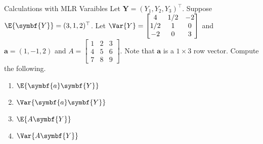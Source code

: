 \begin{Example}{Calculations with MLR Varaibles}{}
    Let $ \symbf{Y}=(Y_1,Y_2,Y_3)^\top $. Suppose
    $ \E{\symbf{Y}}= (3,1,2)^\top $. Let
    $ \Var{Y}=\begin{bmatrix}
            4   & 1/2 & -2 \\
            1/2 & 1   & 0  \\
            -2  & 0   & 3
        \end{bmatrix} $
    and
    $ \symbf{a}=(1,-1,2) $
    and
    $ A=\begin{bmatrix}
            1 & 2 & 3 \\
            4 & 5 & 6 \\
            7 & 8 & 9
        \end{bmatrix} $. Note that $ \symbf{a} $ is a
    $ 1\times 3 $ row vector. Compute the following.

    \begin{enumerate}[label=(\roman*)]
        \item $ \E{\symbf{a}\symbf{Y}} $
        \item $ \Var{\symbf{a}\symbf{Y}} $
        \item $ \E{A\symbf{Y}} $
        \item $ \Var{A\symbf{Y}} $
    \end{enumerate}


\end{Example}
